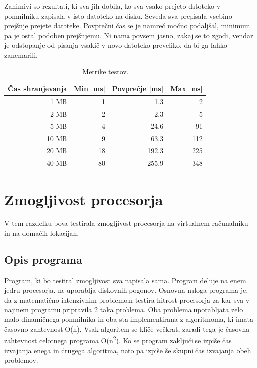 Zanimivi so rezultati, ki sva jih dobila, ko sva vsako prejeto datoteko v pomnilniku zapisala v isto datoteko na disku. Seveda sva prepisala vsebino prejšnje prejete datoteke. Povprečni čas se je namreč močno podaljšal, minimum pa je ostal podoben prejšnjemu. Ni nama povsem jasno, zakaj se to zgodi, vendar je odstopanje od pisanja vsakič v novo datoteko preveliko, da bi ga lahko zanemarili.

\begin{table}[H]
	\centering
	\begin{tabular}{ | r | r | r | r | }
		\hline
		Čas shranjevanja & Min [ms] & Povprečje [ms] & Max [ms]  \\
		\hline
		1 MB & 1 & 1.3 & 2 \\
		2 MB & 2 & 2.3 & 5 \\
		5 MB & 4 & 24.6 & 91 \\
		10 MB & 9 & 63.3 & 112 \\
		20 MB & 18 & 192.3 & 225 \\
		40 MB & 80 & 255.9 & 348 \\
		\hline
	\end{tabular}
	\caption{Metrike  testov.}
	\label{table:1_chunks}
\end{table}

\section{Zmogljivost procesorja}

V tem razdelku bova testirala zmogljivost procesorja na virtualnem računalniku in na domačih lokacijah.


\subsection{Opis programa}

Program, ki bo testiral zmogljivost sva napisala sama. Program deluje na enem jedru procesorja. ne uporablja diskovnih pogonov.
Osnovna naloga programa je, da z matematično intenzivnim problemom testira hitrost procesorja za kar sva v najinem programu pripravila 2 taka problema. Oba problema uporabljata zelo malo dinamičnega pomnilnika in oba sta implementirana z algoritmoma, ki imata časovno zahtevnost O(n). Vsak algoritem se kliče večkrat, zaradi tega je časovna zahtevnost celotnega programa O(n\textsuperscript{2}). Ko se program zaključi se izpiše čas izvajanja enega in drugega algoritma, nato pa izpiše še skupni čas izvajanja obeh problemov.



